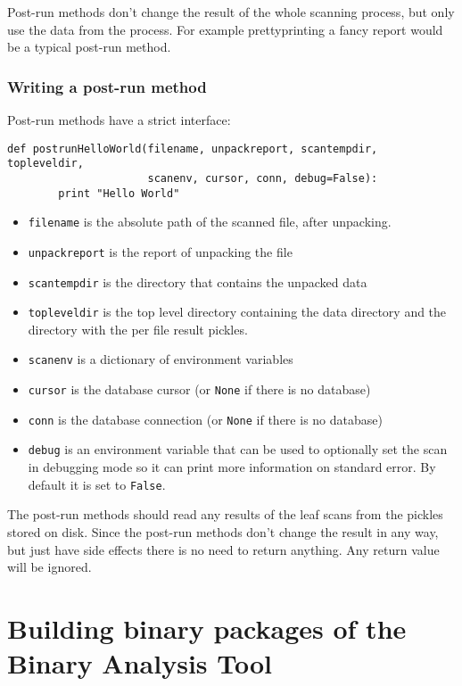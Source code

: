\documentclass[10pt,a4paper]{article}
\begin{document}
Post-run methods don't change the result of the whole scanning process, but
only use the data from the process. For example prettyprinting a fancy report
would be a typical post-run method.

\subsubsection{Writing a post-run method}

Post-run methods have a strict interface:

\begin{verbatim}
def postrunHelloWorld(filename, unpackreport, scantempdir, topleveldir,
                      scanenv, cursor, conn, debug=False):
        print "Hello World"
\end{verbatim}

\begin{itemize}
\item \texttt{filename} is the absolute path of the scanned file, after
unpacking.
\item \texttt{unpackreport} is the report of unpacking the file
\item \texttt{scantempdir} is the directory that contains the unpacked data
\item \texttt{topleveldir} is the top level directory containing the data
directory and the directory with the per file result pickles.
\item \texttt{scanenv} is a dictionary of environment variables
\item \texttt{cursor} is the database cursor (or \texttt{None} if there is no
database)
\item \texttt{conn} is the database connection (or \texttt{None} if there is no
database)
\item \texttt{debug} is an environment variable that can be used to optionally
set the scan in debugging mode so it can print more information on standard
error. By default it is set to \texttt{False}.
\end{itemize}

The post-run methods should read any results of the leaf scans from the pickles
stored on disk. Since the post-run methods don't change the result in any way,
but just have side effects there is no need to return anything. Any return value
will be ignored.

\section{Building binary packages of the Binary Analysis Tool}
\end{document}
